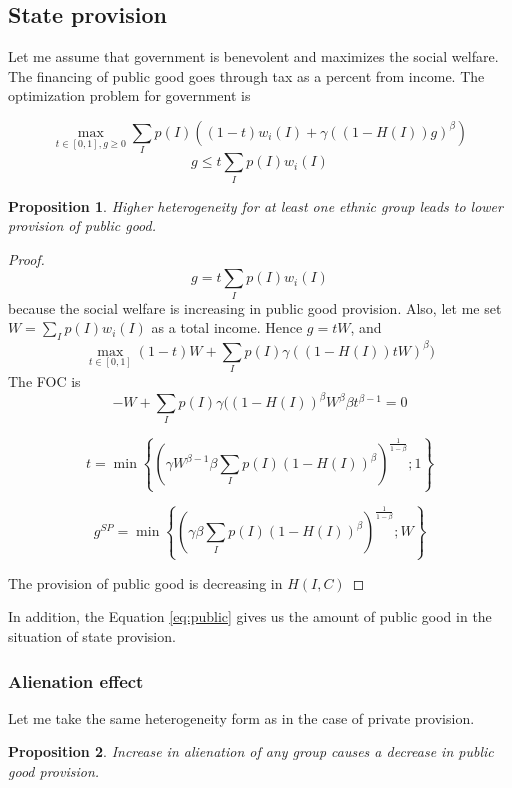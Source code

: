 \documentclass[letterpaper,11pt]{article}
\newtheorem{proposition}{Proposition}
\begin{document}

\subsection{State provision}

Let me assume that government is benevolent and maximizes the social welfare. The financing of public good goes through tax as a percent from income. The optimization problem for government is

\[ \max_{t\in[0,1], g\ge 0} \sum_{I} p(I) ( (1-t)w_i(I) + \gamma( (1 - H(I)) g)^\beta)  \]
\[ g \le t\sum_{I} p(I) w_i(I)  \]

\begin{proposition}
Higher heterogeneity for at least one ethnic group leads to lower provision of public good.
\end{proposition}

\begin{proof}

\[ g = t\sum_{I} p(I) w_i(I)  \]
because the social welfare is increasing in public good provision. 
Also, let me set $W = \sum_{I} p(I) w_i(I) $ as a total income. Hence $g = tW$, and
\[ \max_{t\in[0,1]} (1-t) W + \sum_{I} p(I) \gamma( (1 - H(I)) tW)^\beta)  \]
The FOC is 
\[ -W + \sum_{I} p(I) \gamma ((1 - H(I))^\beta W^\beta \beta t^{\beta - 1} = 0 \]

\[t = \min \left\{ \left( \gamma W^{\beta - 1} \beta\sum_{I} p(I) (1 - H(I))^\beta \right)^\frac{1}{1 - \beta}; 1 \right\} \]

\begin{equation}
    g^{SP} = \min \left\{ \left( \gamma  \beta\sum_{I} p(I) (1 - H(I))^\beta \right)^\frac{1}{1 - \beta}; W \right\}
    \label{eq:public}
\end{equation}

The provision of public good is decreasing in $H(I,C)$
\end{proof}

In addition, the Equation \ref{eq:public} gives us the amount of public good in the situation of state provision.

\subsubsection{Alienation effect}

Let me take the same heterogeneity form as in the case of private provision.

\begin{proposition}
    Increase in alienation of any group causes a decrease in public good provision.
\end{proposition}
\end{document}
